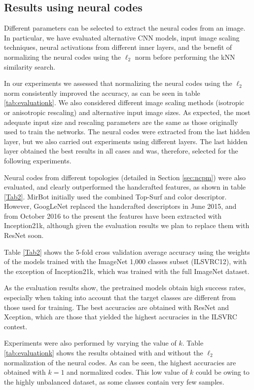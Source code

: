 \documentclass[final, twocolumn]{elsarticle}
\begin{document}
\subsection{Results using neural codes}

Different parameters can be selected to extract the neural codes from an image. In particular, we have evaluated alternative CNN models, input image scaling techniques, neural activations from different inner layers, and the benefit of normalizing the neural codes using the $\ell_2$ norm before performing the kNN similarity search.

In our experiments we assessed that normalizing the neural codes using the $\ell_2$ norm consistently improved the accuracy, as can be seen in table \ref{tab:evaluationk}. We also considered different image scaling methods (isotropic or anisotropic rescaling) and alternative input image sizes. As expected, the most adequate input size and rescaling parameters are the same as those originally used to train the networks. The neural codes were extracted from the last hidden layer, but we also carried out experiments using different layers. The last hidden layer obtained the best results in all cases and was, therefore, selected for the following experiments.

Neural codes from different topologies (detailed in Section \ref{sec:ncpm}) were also evaluated, and clearly outperformed the handcrafted features, as shown in table \ref{Tab2}. MirBot initially used the combined Top-Surf and color descriptor. However, GoogLeNet replaced the handcrafted descriptors in June 2015, and from October 2016 to the present the features have been extracted with Inception21k, although given the evaluation results we plan to replace them with ResNet soon.

Table \ref{Tab2} shows the 5-fold cross validation average accuracy using the weights of the models trained with the ImageNet 1,000 classes subset (ILSVRC12), with the exception of Inception21k, which was trained with the full ImageNet dataset.

As the evaluation results show, the pretrained models obtain high success rates, especially when taking into account that the target classes are different from those used for training. The best accuracies are obtained with ResNet and Xception, which are those that yielded the highest accuracies in the ILSVRC contest.

Experiments were also performed by varying the value of $k$. Table \ref{tab:evaluationk} shows the results obtained with and without the $\ell_2$ normalization of the neural codes. As can be seen, the highest accuracies are obtained with $k=1$ and normalized codes. This low value of $k$ could be owing to the highly unbalanced dataset, as some classes contain very few samples.
\end{document}
